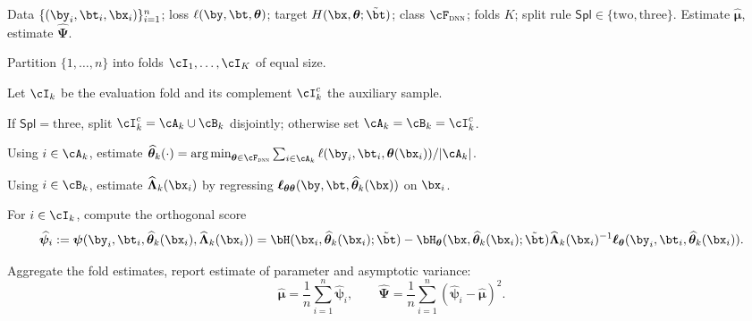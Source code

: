 \documentclass[12pt]{article}
\numberwithin{equation}{section}
\theoremstyle{definition}
\newcommand{\sumi}{\sum_{i=1}^n}
\DeclareMathOperator*{\argmin}{arg\,min}
\newcommand{\btheta}{\boldsymbol{\theta}}
\newcommand{\bpsi}{\boldsymbol{\psi}}
\newcommand{\bL}{\boldsymbol{\Lambda}}
\newcommand{\btstar}{\tilde{\bt}}
\newcommand{\bmhat}{\bm{\widehat{\mu}}}
\newcommand{\bthat}{\bm{\widehat{\theta}}}
\newcommand{\bPsihat}{\bm{\widehat{\Psi}}}
\newcommand{\bLhat}{\widehat{\bL}}
\begin{document}
\begin{algorithm}[ht]
	\caption{Structural Deep Learning -- Cross-Fitting for Estimation and Inference}
	\label{alg:crossfitting}
	\footnotesize
	\setlength{\abovedisplayskip}{3pt}
	\setlength{\belowdisplayskip}{3pt}
	\begin{algorithmic}[1]
		\Require Data $\{(\by_i, \bt_i, \bx_i)\}_{i=1}^n$; loss $\ell(\by, \bt,\btheta)$; target $H(\bx,\btheta; \btstar)$; class $\cF_{\textsc{dnn}}$; folds $K$; split rule $\mathsf{Spl}\in\{\mathrm{two},\mathrm{three}\}$.
		\Ensure Estimate $\bmhat$, estimate $\bPsihat$.
		
		\State Partition $\{1,\ldots,n\}$ into folds $\cI_1,\ldots,\cI_K$ of equal size.
		
			\State Let $\cI_k$ be the evaluation fold and its complement $\cI_k^c$ the auxiliary sample.
			
			\State If $\mathsf{Spl}=\mathrm{three}$, split $\cI_k^c=\cA_k\cup\cB_k$ disjointly; otherwise set $\cA_k=\cB_k=\cI_k^c$.
				
			\State Using $i\in\cA_k$, estimate $\bthat_k(\cdot) = \argmin_{\btheta \in \cF_{\textsc{dnn}}} \sum_{i\in\cA_k} \ell(\by_i,\bt_i,\btheta(\bx_i)) / |\cA_k|$.
				
			\State Using $i\in\cB_k$, estimate $\bLhat_k(\bx_i)$ by regressing $\bm{\ell}_{\btheta\btheta}(\by,\bt, \bthat_k(\bx))$ on $\bx_i$.
				
			\State For $i\in\cI_k$, compute the orthogonal score
				    	\[
				        	\widehat{\bpsi}_i := \bpsi(\by_i, \bt_i, \bthat_k(\bx_i), \bLhat_k(\bx_i)) =  \bH(\bx_i, \bthat_k(\bx_i); \btstar)   - \bH_{\btheta}(\bx, \bthat_k(\bx_i); \btstar) \bLhat_k(\bx_i)^{-1} \bm{\ell}_{\btheta}(\by_i, \bt_i, \bthat_k(\bx_i)).
				    	\]
		    	
		\EndFor
		
		\State Aggregate the fold estimates, report estimate of parameter and asymptotic variance:
			\[
				\bmhat = \frac{1}{n}\sumi \widehat{\bpsi}_i, \qquad \bPsihat = \frac{1}{n} \sumi (\widehat{\bpsi}_i - \bmhat)^2.
			\]
		
	\end{algorithmic}
\end{algorithm}
\end{document}
